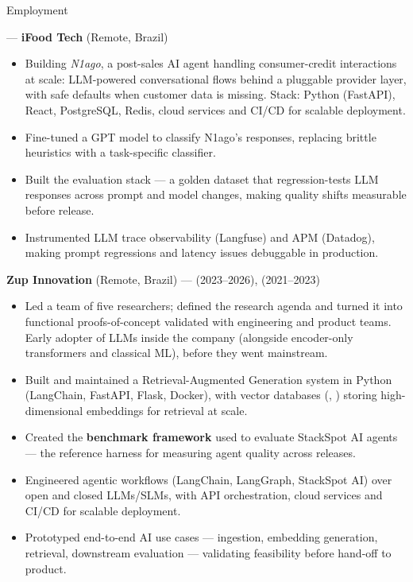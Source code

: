 \begin{rubric}{Employment}

\entry*[2026--now]
   --- \textbf{iFood Tech} (Remote, Brazil)
  \begin{itemize}
  \item Building \emph{N1ago}, a post-sales AI agent handling consumer-credit interactions at scale:
    LLM-powered conversational flows behind a pluggable provider layer, with safe defaults when
    customer data is missing. Stack: Python (FastAPI), React, PostgreSQL, Redis, cloud services
    and CI/CD for scalable deployment.
  \item Fine-tuned a GPT model to classify N1ago's responses, replacing brittle heuristics with a
    task-specific classifier.
  \item Built the evaluation stack --- a golden dataset that regression-tests LLM responses across
    prompt and model changes, making quality shifts measurable before release.
  \item Instrumented LLM trace observability (Langfuse) and APM (Datadog), making prompt
    regressions and latency issues debuggable in production.
  \end{itemize}

\entry*[2021--2026]
  \textbf{Zup Innovation} (Remote, Brazil) ---  (2023--2026),
   (2021--2023)
  \begin{itemize}
  \item Led a team of five researchers; defined the research agenda and turned it into functional
    proofs-of-concept validated with engineering and product teams. Early adopter of LLMs inside
    the company (alongside encoder-only transformers and classical ML), before they went mainstream.
  \item Built and maintained a Retrieval-Augmented Generation system in Python (LangChain, FastAPI,
    Flask, Docker), with vector databases (, ) storing
    high-dimensional embeddings for retrieval at scale.
  \item Created the \textbf{benchmark framework} used to evaluate StackSpot AI agents --- the
    reference harness for measuring agent quality across releases.
  \item Engineered agentic workflows (LangChain, LangGraph, StackSpot AI) over open and closed
    LLMs/SLMs, with API orchestration, cloud services and CI/CD for scalable deployment.
  \item Prototyped end-to-end AI use cases --- ingestion, embedding generation, retrieval,
    downstream evaluation --- validating feasibility before hand-off to product.
  \end{itemize}


\end{rubric}
